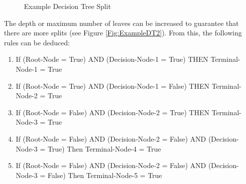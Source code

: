 \documentclass[../thesis.tex]{subfiles}
\begin{document}
\begin{figure}[h!]
\centering
{}
    \caption{Example Decision Tree Split}
    \label{Fig:ExampleDT1}
\end{figure}

The depth or maximum number of leaves can be increased to guarantee that there are more splits (see Figure \ref{Fig:ExampleDT2}). From this, the following rules can be deduced:

\begin{enumerate}
    \item If (Root-Node = True) AND (Decision-Node-1 = True) THEN Terminal-Node-1 = True
    \item If (Root-Node = True) AND (Decision-Node-1 = False) THEN Terminal-Node-2 = True
    \item If (Root-Node = False) AND (Decision-Node-2 = True) THEN Terminal-Node-3 = True    
    \item If (Root-Node = False) AND (Decision-Node-2 = False) AND (Decision-Node-3 = True) Then Terminal-Node-4 = True
    \item If (Root-Node = False) AND (Decision-Node-2 = False) AND (Decision-Node-3 = False) Then Terminal-Node-5 = True   
\end{enumerate}
\end{document}
